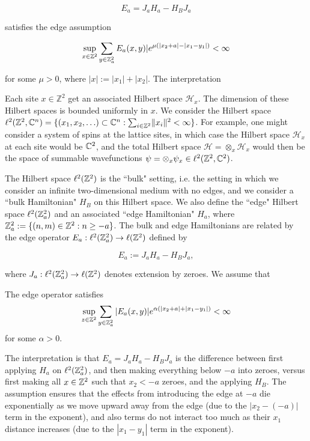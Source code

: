 \documentclass[12pt, letterpaper]{article}
\begin{document}
\[E_a = J_aH_a-H_BJ_a\]

satisfies the edge assumption

\[\sup_{x\in\mathbb{Z}^2}\sum_{y\in\mathbb{Z}^2_a} E_a(x,y)|e^{\mu(|x_2+a|-|x_1-y_1|)} < \infty\]

for some $\mu>0$, where $|x| := |x_1|+|x_2|$. The interpretation





Each site $x \in \mathbb{Z}^2$ get an associated Hilbert space $\mathcal{H}_x$. The dimension of these Hilbert spaces is bounded uniformly in $x$. We consider the Hilbert space $\ell^2(\mathbb{Z}^2, \mathbb{C}^n) = \{ (x_1,x_2,\ldots) \subset \mathbb{C}^n : \sum_{i \in \mathbb{Z}^2} \lVert x_i \rVert^2 < \infty\}$. For example, one might consider a system of spins at the lattice sites, in which case the Hilbert space $\mathcal{H}_x$ at each site would be $\mathbb{C}^2$, and the total Hilbert space $\mathcal{H} = \otimes_x \mathcal{H}_x$ would then be the space of summable wavefunctions $\psi = \otimes_x\psi_x \in \ell^2(\mathbb{Z}^2,\mathbb{C}^2)$.

The Hilbert space $\ell^2(\mathbb{Z}^2)$ is the ``bulk" setting, i.e. the setting in which we consider an infinite two-dimensional medium with no edges, and we consider a ``bulk Hamiltonian" $H_B$ on this Hilbert space. We also define the ``edge" Hilbert space $\ell^2(\mathbb{Z}_a^2)$ and an associated ``edge Hamiltonian" $H_a$, where $\mathbb{Z}^2_a := \{(n,m) \in \mathbb{Z}^2 : n \geq -a\}$. The bulk and edge Hamiltonians are related by the edge operator $E_a : \ell^2(\mathbb{Z}^2_a) \to \ell(\mathbb{Z}^2)$ defined by

\[E_a := J_aH_a - H_BJ_a,\]

where $J_a : \ell^2(\mathbb{Z}_a^2) \to \ell(\mathbb{Z}^2)$ denotes extension by zeroes. We assume that

\begin{assumption}
The edge operator satisfies
\[\sup_{z\in\mathbb{Z}^2}\sum_{y\in\mathbb{Z}^2_a} |E_a(x,y)| e^{\alpha(|x_2 + a| + |x_1-y_1|)} < \infty\]
for some $\alpha>0$.
\label{ass:edge}
\end{assumption}



The interpretation is that $E_a = J_aH_a - H_BJ_a$ is the difference between first applying $H_a$ on $\ell^2(\mathbb{Z}^2_a)$, and then making everything below $-a$ into zeroes, versus first making all $x \in \mathbb{Z}^2$ such that $x_2 < -a$ zeroes, and the applying $H_B$. The assumption ensures that the effects from introducing the edge at $-a$ die exponentially as we move upward away from the edge (due to the $|x_2 - (-a)|$ term in the exponent), and also terms do not interact too much as their $x_1$ distance increases (due to the $|x_1-y_1|$ term in the exponent).
\end{document}
